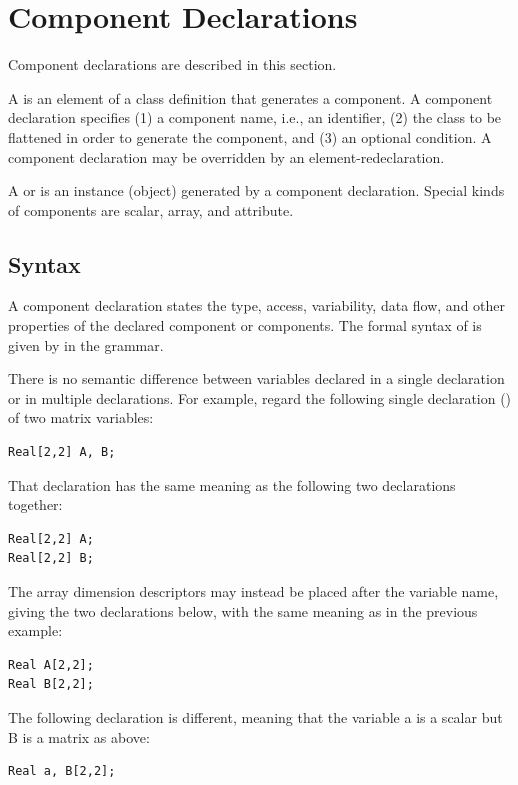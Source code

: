 \section{Component Declarations}\label{component-declarations}

Component declarations are described in this section.

A  is an element of a class definition that generates a component.
A component declaration specifies (1) a component name, i.e., an identifier, (2) the class to be flattened in order to generate the component, and (3) an optional condition.
A component declaration may be overridden by an element-redeclaration.

A  or  is an instance (object) generated by a component declaration.
Special kinds of components are scalar, array, and attribute.

\subsection{Syntax}\label{component-declaration-syntax}\label{syntax-and-examples-of-component-declarations}

A component declaration states the type, access, variability, data flow, and other properties of the declared component or components.
The formal syntax of is given by  in the grammar.

\begin{nonnormative}
There is no semantic difference between variables declared in a single declaration or in multiple declarations.
For example, regard the following single declaration () of two matrix variables:
\begin{lstlisting}[language=modelica]
Real[2,2] A, B;
\end{lstlisting}
That declaration has the same meaning as the following two declarations together:
\begin{lstlisting}[language=modelica]
Real[2,2] A;
Real[2,2] B;
\end{lstlisting}
The array dimension descriptors may instead be placed after the variable name, giving the two declarations below, with the same meaning as in the previous example:
\begin{lstlisting}[language=modelica]
Real A[2,2];
Real B[2,2];
\end{lstlisting}
The following declaration is different, meaning that the variable a is a scalar but B is a matrix as above:
\begin{lstlisting}[language=modelica]
Real a, B[2,2];
\end{lstlisting}
\end{nonnormative}

